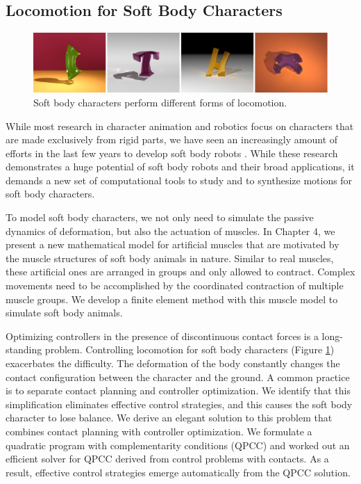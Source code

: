 \subsection{Locomotion for Soft Body Characters}

\begin{figure}[!h]
  \centering
    \includegraphics[width=\textwidth]{figures/teaserSoftBody.eps}
  \caption{Soft body characters perform different forms of locomotion.}
  \label{fig:teaser2}
\end{figure}

While most research in character animation and robotics focus on characters that are made exclusively from rigid parts, we have seen an increasingly amount of efforts in the last few years to develop soft body robots \cite{}. While these research demonstrates a huge potential of soft body robots and their broad applications, it demands a new set of computational tools to study and to synthesize motions for soft body characters.

To model soft body characters, we not only need to simulate the passive dynamics of deformation, but also the actuation of muscles. In Chapter 4, we present a new mathematical model for artificial muscles that are motivated by the muscle structures of soft body animals in nature. Similar to real muscles, these artificial ones are arranged in groups and only allowed to contract. Complex movements need to be accomplished by the coordinated contraction of multiple muscle groups. We develop a finite element method with this muscle model to simulate soft body animals.

Optimizing controllers in the presence of discontinuous contact forces is a long-standing problem. Controlling locomotion for soft body characters (Figure \ref{fig:teaser2}) exacerbates the difficulty. The deformation of the body constantly changes the contact configuration between the character and the ground. A common practice is to separate contact planning and controller optimization. We identify that this simplification eliminates effective control strategies, and this causes the soft body character to lose balance. We derive an elegant solution to this problem that combines contact planning with controller optimization. We formulate a quadratic program with complementarity conditions (QPCC) and worked out an efficient solver for QPCC derived from control problems with contacts. As a result, effective control strategies emerge automatically from the QPCC solution.

